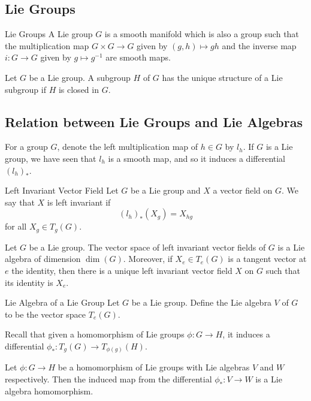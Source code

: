 \documentclass[a4paper]{article}
\begin{document}
\subsection{Lie Groups}
\begin{defn}{Lie Groups}{} A Lie group $G$ is a smooth manifold which is also a group such that the multiplication map $G\times G\to G$ given by $(g,h)\mapsto gh$ and the inverse map $i:G\to G$ given by $g\mapsto g^{-1}$ are smooth maps. 
\end{defn}

\begin{prp}{}{} Let $G$ be a Lie group. A subgroup $H$ of $G$ has the unique structure of a Lie subgroup if $H$ is closed in $G$. 
\end{prp}

\subsection{Relation between Lie Groups and Lie Algebras}
For a group $G$, denote the left multiplication map of $h\in G$ by $l_h$. If $G$ is a Lie group, we have seen that $l_h$ is a smooth map, and so it induces a differential $(l_h)_\ast$. 

\begin{defn}{Left Invariant Vector Field}{} Let $G$ be a Lie group and $X$ a vector field on $G$. We say that $X$ is left invariant if $$(l_h)_\ast(X_g)=X_{hg}$$ for all $X_g\in T_g(G)$. 
\end{defn}

\begin{prp}{}{} Let $G$ be a Lie group. The vector space of left invariant vector fields of $G$ is a Lie algebra of dimension $\dim(G)$. Moreover, if $X_e\in T_e(G)$ is a tangent vector at $e$ the identity, then there is a unique left invariant vector field $X$ on $G$ such that its identity is $X_e$. 
\end{prp}

\begin{defn}{Lie Algebra of a Lie Group}{} Let $G$ be a Lie group. Define the Lie algebra $V$ of $G$ to be the vector space $T_e(G)$. 
\end{defn}

Recall that given a homomorphism of Lie groups $\phi:G\to H$, it induces a differential $\phi_\ast:T_g(G)\to T_{\phi(g)}(H)$. 

\begin{prp}{}{} Let $\phi:G\to H$ be a homomorphism of Lie groups with Lie algebras $V$ and $W$ respectively. Then the induced map from the differential $\phi_\ast:V\to W$ is a Lie algebra homomorphism. 
\end{prp}
\end{document}
